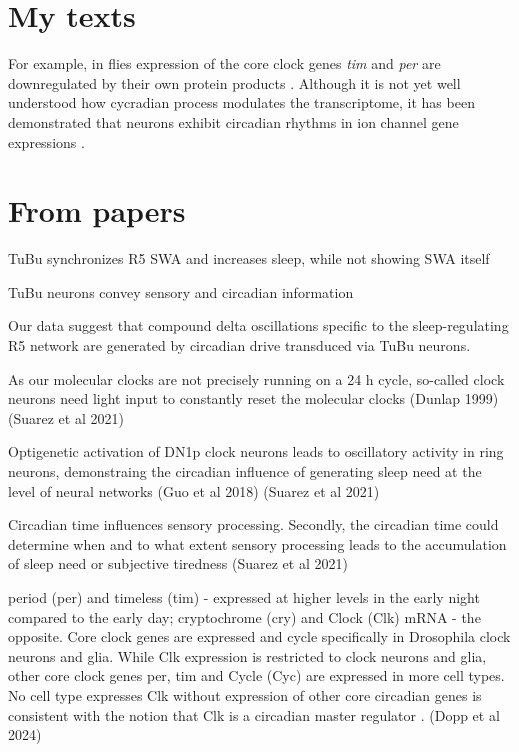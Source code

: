 \documentclass[12pt]{article}
\begin{document}
\section{My texts}

For example, in flies expression of the core clock genes \textit{tim} and \textit{per} are
downregulated by their own protein products \cite{dubowyCircadianRhythmsSleep2017}.
Although it is not yet well understood how cycradian process modulates the transcriptome,
it has been demonstrated that neurons exhibit circadian rhythms in ion channel gene expressions
\cite{doppSinglecellTranscriptomicsReveals2024,dubowyCircadianRhythmsSleep2017,andreaniCircadianProgrammingEllipsoid2022}.

\noindent\hrulefill

\section{From papers}

TuBu synchronizes R5 SWA and increases sleep, while not showing SWA itself \cite{raccugliaNetworkSpecificSynchronizationElectrical2019,suarez-grimaltNeuralArchitectureSleep2021}

TuBu neurons convey sensory and circadian information \cite{raccugliaNetworkSpecificSynchronizationElectrical2019}


Our data suggest that compound delta oscillations specific to the sleep-regulating R5
network are generated by circadian drive transduced via TuBu neurons. \cite{raccugliaNetworkSpecificSynchronizationElectrical2019}


As our molecular clocks are not precisely running on a 24 h cycle, so-called clock neurons need light input to constantly reset the molecular
clocks (Dunlap 1999) \cite{suarez-grimaltNeuralArchitectureSleep2021}
(Suarez et al 2021)

Optigenetic activation of DN1p clock neurons leads to oscillatory activity in ring neurons,
demonstraing the circadian influence of generating sleep need at the level of neural networks 
(Guo et al 2018) \cite{suarez-grimaltNeuralArchitectureSleep2021}
(Suarez et al 2021)

Circadian time influences sensory processing. Secondly, the circadian time could determine
when and to what extent sensory processing leads to the accumulation of sleep need
or subjective tiredness \cite{suarez-grimaltNeuralArchitectureSleep2021}
(Suarez et al 2021)

    
period (per) and timeless (tim) - expressed at higher levels in the early night
compared to the early day; cryptochrome (cry) and Clock (Clk) mRNA - the opposite.
Core clock genes are expressed and cycle specifically in Drosophila clock
neurons and glia. While Clk expression is restricted to clock neurons and glia,
other core clock genes per, tim and Cycle (Cyc) are expressed in more cell types.
No cell type expresses Clk without expression of other core circadian genes is
consistent with the notion that Clk is a circadian master regulator
\cite{doppSinglecellTranscriptomicsReveals2024}.
(Dopp et al 2024)
\end{document}
